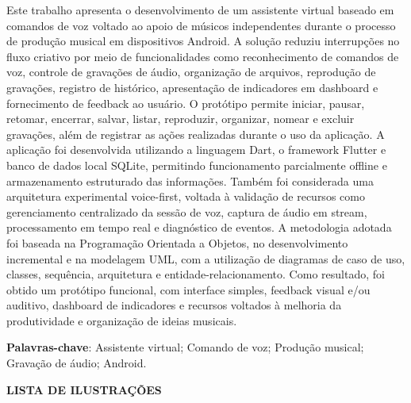 \documentclass[12pt,oneside,a4paper,brazil,final]{abntex2}
\begin{document}
\begin{resumo}
\noindent
Este trabalho apresenta o desenvolvimento de um assistente virtual baseado em comandos de voz voltado ao apoio de músicos independentes durante o processo de produção musical em dispositivos Android. A solução reduziu interrupções no fluxo criativo por meio de funcionalidades como reconhecimento de comandos de voz, controle de gravações de áudio, organização de arquivos, reprodução de gravações, registro de histórico, apresentação de indicadores em dashboard e fornecimento de feedback ao usuário. O protótipo permite iniciar, pausar, retomar, encerrar, salvar, listar, reproduzir, organizar, nomear e excluir gravações, além de registrar as ações realizadas durante o uso da aplicação. A aplicação foi desenvolvida utilizando a linguagem Dart, o framework Flutter e banco de dados local SQLite, permitindo funcionamento parcialmente offline e armazenamento estruturado das informações. Também foi considerada uma arquitetura experimental voice-first, voltada à validação de recursos como gerenciamento centralizado da sessão de voz, captura de áudio em stream, processamento em tempo real e diagnóstico de eventos. A metodologia adotada foi baseada na Programação Orientada a Objetos, no desenvolvimento incremental e na modelagem UML, com a utilização de diagramas de caso de uso, classes, sequência, arquitetura e entidade-relacionamento. Como resultado, foi obtido um protótipo funcional, com interface simples, feedback visual e/ou auditivo, dashboard de indicadores e recursos voltados à melhoria da produtividade e organização de ideias musicais.

\vspace{\onelineskip}

\noindent
\textbf{Palavras-chave}: Assistente virtual; Comando de voz; Produção musical; Gravação de áudio; Android.
\end{resumo}






\cleardoublepage

\begin{center}

\textbf{LISTA DE ILUSTRAÇÕES}

\end{center}
\end{document}
